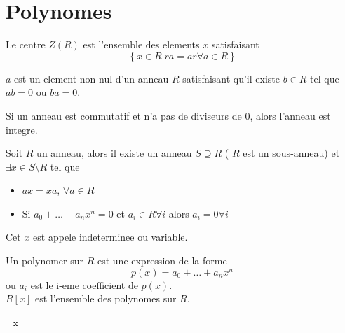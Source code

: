 \documentclass[../main.tex]{subfiles}
\begin{document}
\section{Polynomes}
\begin{defn}\label{defn:Centre d'un anneaucentre_d_un_anneau}
	Le centre $Z( R) $ est l'ensemble des elements $x$ satisfaisant
	\[ 
	\left\{ x \in R | ra = ar \forall a \in R \right\} 
	\]
	
\end{defn}
\begin{defn}[Diviseurs de 0]
	$a$ est un element non nul d'un anneau $R$ satisfaisant qu'il existe $b\in R$ tel que $ab=0$ ou  $ba=0$.

\end{defn}
\begin{defn}\label{defn:Anneau integreanneau_integre}
	Si un anneau est commutatif et n'a pas de diviseurs de 0, alors l'anneau est integre.
\end{defn}
\begin{thm}
	Soit $R$ un anneau, alors il existe un anneau $S \supseteq R$ ( $R$ est un sous-anneau) et $\exists x \in S \setminus R$ tel que 
	\begin{itemize}
		\item $ax=xa$, $\forall a \in R$ 
		\item Si $a_0 + \ldots + a_n x^{n} =0$ et $a_i \in R \forall i$ alors $a_i=0 \forall i$
	\end{itemize}
	Cet $x$ est appele indeterminee ou variable.
	
\end{thm}
\begin{defn}[Polynome]\label{defn:Polynomepolynome}
	Un polynomer sur $R$ est une expression de la forme
	\[ 
		p( x) = a_0 + \ldots + a_n x^{n}
	\]
	ou $a_i$ est le i-eme coefficient de $p( x)$.\\
	$ R[x]$ est l'ensemble des polynomes sur $R$.
\end{defn}
\del_x{}
\end{document}

